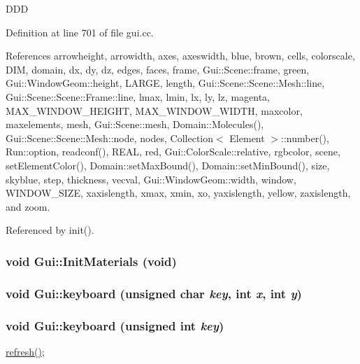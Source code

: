 DDD 

Definition at line 701 of file gui.cc.

References arrowheight, arrowidth, axes, axeswidth, blue, brown, cells, colorscale, DIM, domain, dx, dy, dz, edges, faces, frame, Gui::Scene::frame, green, Gui::WindowGeom::height, LARGE, length, Gui::Scene::Scene::Mesh::line, Gui::Scene::Scene::Frame::line, lmax, lmin, lx, ly, lz, magenta, MAX\_\-WINDOW\_\-HEIGHT, MAX\_\-WINDOW\_\-WIDTH, maxcolor, maxelements, mesh, Gui::Scene::mesh, Domain::Molecules(), Gui::Scene::Scene::Mesh::node, nodes, Collection$<$ Element $>$::number(), Run::option, readconf(), REAL, red, Gui::ColorScale::relative, rgbcolor, scene, setElementColor(), Domain::setMaxBound(), Domain::setMinBound(), size, skyblue, step, thickness, vecval, Gui::WindowGeom::width, window, WINDOW\_\-SIZE, xaxislength, xmax, xmin, xo, yaxislength, yellow, zaxislength, and zoom.

Referenced by init().\hypertarget{namespaceGui_6b37f7051aba2059c1b5b91694708408}{
\subsubsection[{InitMaterials}]{\setlength{\rightskip}{0pt plus 5cm}void Gui::InitMaterials (void)}}
\label{namespaceGui_6b37f7051aba2059c1b5b91694708408}


\hypertarget{namespaceGui_65935dbee960e580e4aa401013022f14}{
\subsubsection[{keyboard}]{\setlength{\rightskip}{0pt plus 5cm}void Gui::keyboard (unsigned char {\em key}, \/  int {\em x}, \/  int {\em y})}}
\label{namespaceGui_65935dbee960e580e4aa401013022f14}


\hypertarget{namespaceGui_8c6bd3add9cc9a25f67c4bcb75fb3c11}{
\subsubsection[{keyboard}]{\setlength{\rightskip}{0pt plus 5cm}void Gui::keyboard (unsigned int {\em key})}}
\label{namespaceGui_8c6bd3add9cc9a25f67c4bcb75fb3c11}




\hyperlink{namespaceGui_5b94ce6e857635065a0c2053b95529b5}{refresh()}; 


